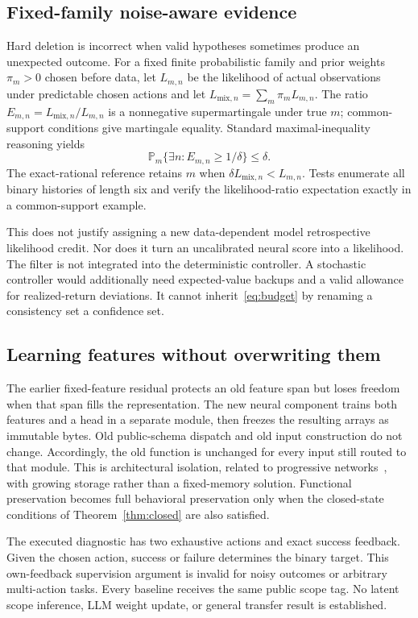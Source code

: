 \documentclass[10pt,twocolumn]{article}
\newcommand{\PP}{\mathbb P}
\begin{document}
\subsection{Fixed-family noise-aware evidence}
Hard deletion is incorrect when valid hypotheses sometimes produce an unexpected
outcome. For a fixed finite probabilistic family and prior weights $\pi_m>0$
chosen before data, let $L_{m,n}$ be the likelihood of actual observations under
predictable chosen actions and let $L_{\mathrm{mix},n}=\sum_m\pi_mL_{m,n}$.
The ratio $E_{m,n}=L_{\mathrm{mix},n}/L_{m,n}$ is a nonnegative supermartingale
under true $m$; common-support conditions give martingale equality. Standard
maximal-inequality reasoning yields~\cite{confidence}
\begin{equation}
 \PP_m\{\exists n:E_{m,n}\geq1/\delta\}\leq\delta.
\end{equation}
The exact-rational reference retains $m$ when $\delta L_{\mathrm{mix},n}<L_{m,n}$.
Tests enumerate all binary histories of length six and verify the likelihood-ratio
expectation exactly in a common-support example.

This does not justify assigning a new data-dependent model retrospective
likelihood credit. Nor does it turn an uncalibrated neural score into a likelihood.
The filter is not integrated into the deterministic controller. A stochastic
controller would additionally need expected-value backups and a valid allowance
for realized-return deviations. It cannot inherit~\eqref{eq:budget} by renaming a
consistency set a confidence set.

\subsection{Learning features without overwriting them}
The earlier fixed-feature residual protects an old feature span but loses freedom
when that span fills the representation. The new neural component trains both
features and a head in a separate module, then freezes the resulting arrays as
immutable bytes. Old public-schema dispatch and old input construction do not
change. Accordingly, the old function is unchanged for every input still routed
to that module. This is architectural isolation, related to progressive
networks~\cite{progressive}, with growing storage rather than a fixed-memory
solution. Functional preservation becomes full behavioral preservation only when
the closed-state conditions of Theorem~\ref{thm:closed} are also satisfied.

The executed diagnostic has two exhaustive actions and exact success feedback.
Given the chosen action, success or failure determines the binary target. This
own-feedback supervision argument is invalid for noisy outcomes or arbitrary
multi-action tasks. Every baseline receives the same public scope tag. No latent
scope inference, LLM weight update, or general transfer result is established.
\end{document}
